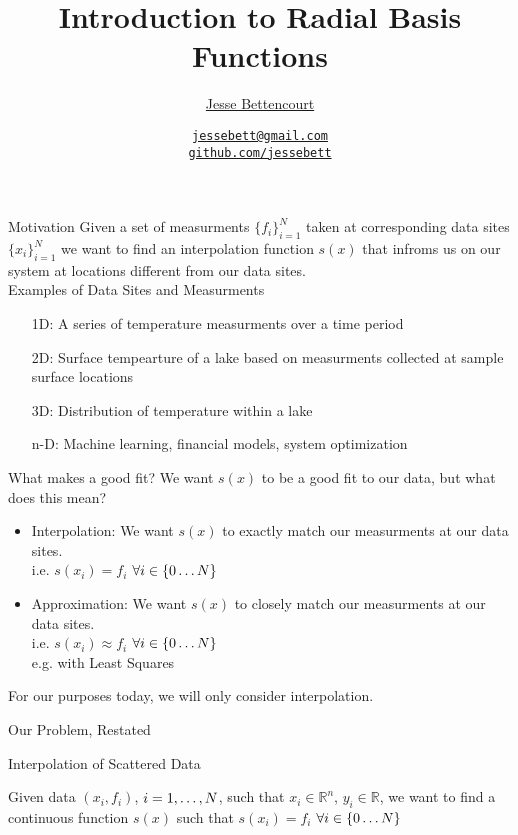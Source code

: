 \documentclass[12pt,t]{beamer}
\title{Introduction to Radial Basis Functions}
\subtitle{}
\author{\href{https://github.com/jessebett/}{Jesse Bettencourt}}
\institute{\href{}{McMaster University}}
\date{\href{jessebett@gmail.com}{\tt \scriptsize jessebett@gmail.com}
\\[-4pt]
\href{http://github.com/jessebett}{\tt \scriptsize github.com/jessebett}
}
\newcommand{\bi}{\begin{itemize}}
\newcommand{\ei}{\end{itemize}}
\newcommand{\subt}[1]{{\footnotesize \color{subtitle} {#1}}}
\begin{document}
{
\frame{
  \titlepage
  \note{}} } 

\begin{frame}{Motivation}
Given a set of measurments \subt{$\{f_i\}_{i=1}^N$}
taken at corresponding data sites \subt{$\{x_i\}_{i=1}^N$}
we want to find an interpolation function \subt{$s(x)$}
that infroms us on our system at locations different from our data sites.\\


\subt{Examples of Data Sites and Measurments}
\begin{itemize}
\item[1D:] A series of temperature measurments over a time period
\item[2D:] Surface tempearture of a lake based on measurments collected at sample surface locations 
\item[3D:] Distribution of temperature within a lake
\item[n-D:] Machine learning, financial models, system optimization
\end{itemize}

\note{}
\end{frame}

\begin{frame}{What makes a good fit?}
We want $s(x)$ to be a good fit to our data, but what does this mean?
\bi
\item Interpolation: We want $s(x)$ to \subt{exactly match} our measurments at our data sites. \\ 
i.e. $s(x_i)=f_i$ $\forall i\in\{0 \mathellipsis N \}$
\item Approximation: We want $s(x)$ to \subt{closely match} our measurments at our data sites.\\
i.e. $s(x_i)\approx f_i$ $\forall i\in\{0 \mathellipsis N \}$ \\
e.g. with Least Squares 
\ei

For our purposes today, we will only consider interpolation.

\note{}
\end{frame}

\begin{frame}{Our Problem, Restated}

\subt{Interpolation of Scattered Data}

Given data $(x_i,f_i)$, $i=1, \mathellipsis, N$, such that $x_i \in \mathbb{R}^n$, $y_i \in \mathbb{R}$, we want to find a continuous function $s(x)$ such that $s(x_i)=f_i$ $\forall i\in\{0 \mathellipsis N \}$

\note{}
\end{frame}
\end{document}
